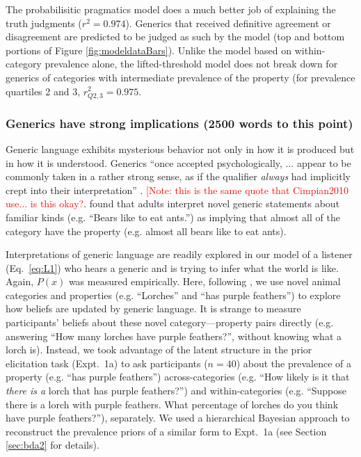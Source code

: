 \documentclass[10pt,letterpaper]{article}
\newcommand{\red}[1]{\textcolor{Red}{#1}}
\begin{document}
The probabilisitic pragmatics model does a much better job of explaining the truth judgments ($r^2=0.974$). 
Generics that received definitive agreement or disagreement are predicted to be judged as such by the model (top and bottom portions of Figure \ref{fig:modeldataBars}). Unlike the model based on within-category prevalence alone, the lifted-threshold model does not break down for generics of categories with intermediate prevalence of the property (for prevalence quartiles 2 and 3, $r_{Q2,3}^2=0.975$. 

\subsubsection{Generics have strong implications (2500 words to this point)} 

Generic language exhibits mysterious behavior not only in how it is produced but in how it is understood.
Generics ``once accepted psychologically, ... appear to be commonly taken in a rather strong sense, as if the qualifier \emph{always} had implicitly crept into their interpretation'' \cite{Abelson1966}. \red{[Note: this is the same quote that Cimpian2010 use... is this okay?}.
%
 found that adults interpret novel generic statements about familiar kinds (e.g. ``Bears like to eat ants.'') as implying that almost all of the category have the property (e.g. almost all bears like to eat ants).

Interpretations of generic language are readily explored in our model of a listener (Eq.~\ref{eq:L1}) who hears a generic and is trying to infer what the world is like. 
Again, $P(x)$ was measured empirically.
Here, following , we use novel animal categories and properties (e.g. ``Lorches'' and ``has purple feathers'') to explore how beliefs are updated by generic language. 
It is strange to measure participants' beliefs about these novel category---property pairs directly (e.g. answering ``How many lorches have purple feathers?'', without knowing what a lorch is).
Instead, we took advantage of the latent structure in the prior elicitation task (Expt.~1a) to ask participants ($n=40$) about the prevalence of a property (e.g. ``has purple feathers'') across-categories (e.g. ``How likely is it that \emph{there is a} lorch that has purple feathers?'') and within-categories (e.g. ``Suppose there is a lorch with purple feathers. What percentage of lorches do you think have purple feathers?''), separately. 
We used a hierarchical Bayesian approach to reconstruct the prevalence priors of a similar form to Expt.~1a (see Section \ref{sec:bda2} for details).
\end{document}
